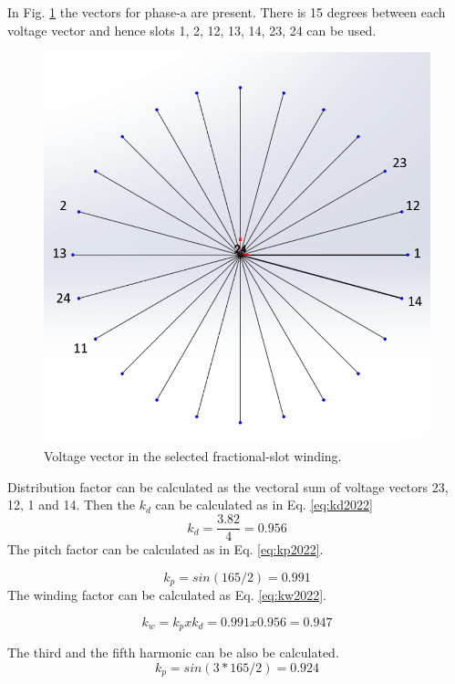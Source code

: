 \documentclass{article}
\begin{document}
In Fig. \ref{fig:22p24svoltage} the vectors for phase-a are present. There is 15 degrees between each voltage vector and hence slots 1, 2, 12, 13, 14, 23, 24 can be used.

\begin{figure}[H]
	\centering
	\includegraphics[width=0.7\linewidth]{Figurler/22p24s_voltage}
	\caption{Voltage vector in the selected fractional-slot winding.}
	\label{fig:22p24svoltage}
\end{figure}

Distribution factor can be calculated as the vectoral sum of voltage vectors 23, 12, 1 and 14. Then the $k_d$ can be calculated as in Eq. \ref{eq:kd2022}
\begin{equation}
k_d=\frac{3.82}{4}=0.956
\label{eq:kd2022}
\end{equation}
The pitch factor can be calculated as in Eq. \ref{eq:kp2022}.

\begin{equation}
k_p=sin(165/2)=0.991
\label{eq:kp2022}
\end{equation}
The winding factor can be calculated as Eq. \ref{eq:kw2022}.

\begin{equation}
k_w=k_pxk_d= 0.991x0.956=0.947
\label{eq:kw2022}
\end{equation}

The third and the fifth harmonic can be also be calculated.\\

\begin{equation}
k_p=sin(3*165/2)= 0.924
\label{eq:kp32022}
\end{equation}
\end{document}
